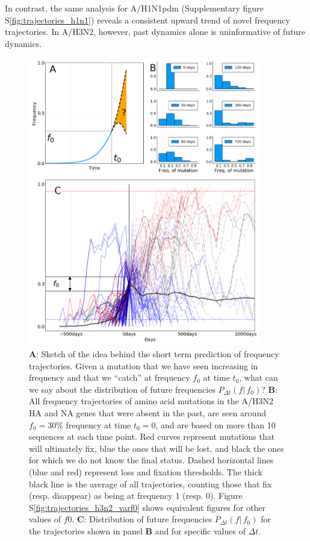 \documentclass[reprint,amsmath,amssymb,superscriptaddress,showpacs,rmp]{revtex4-1}
\newcommand{\sref}[1]{S\ref{#1}}
\begin{document}
In contrast, the same analysis for A/H1N1pdm (Supplementary figure \sref{fig:trajectories_h1n1}) reveals a consistent upward trend of novel frequency trajectories.
In A/H3N2, however, past dynamics alone is uninformative of future dynamics.

\begin{figure}
	\centering
	\includegraphics[width=0.9\textwidth]{./Figures/Panel1.png}
	\caption{\textbf{A}: Sketch of the idea behind the short term prediction of frequency trajectories. Given a mutation that we have seen increasing in frequency and that we ``catch'' at frequency $f_0$ at time $t_0$, what can we say about the distribution of future frequencies $P_{\Delta t}(f\vert\,f_0)$? \textbf{B}: All frequency trajectories of amino acid mutations in the A/H3N2 HA and NA genes that were absent in the past, are seen around $f_0=30\%$ frequency at time $t_0=0$, and are based on more than 10 sequences at each time point. Red curves represent mutations that will ultimately fix, blue the ones that will be lost, and black the ones for which we do not know the final status. Dashed horizontal lines (blue and red) represent loss and fixation thresholds. The thick black line is the average of all trajectories, counting those that fix (resp. disappear) as being at frequency 1 (resp. 0). Figure \sref{fig:trajectories_h3n2_varf0} shows equivalent figures for other values of $f0$. \textbf{C}: Distribution of future frequencies $P_{\Delta t}(f\vert\,f_0)$ for the trajectories shown in panel \textbf{B} and for specific values of $\Delta t$. }
	\label{fig:trajectories}
\end{figure}
\end{document}
